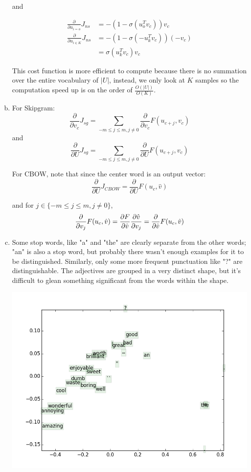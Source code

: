 \documentclass{article}
\newcommand{\dd}[2][]{\frac{\partial #1}{\partial #2}}
\begin{document}
\begin{enumerate}[(a)]
and

\begin{align*} 
\dd{u_{i=o}}J_{ns} &= -(1 - \sigma(u_o^T v_c))v_c \\ 
\dd{u_{i \in K}}J_{ns} &= -(1 - \sigma(-u_k^T v_c))(-v_c) \\
&= \sigma(u_k^T v_c) v_c
\end{align*}

This cost function is more efficient to compute because there is no summation over the entire vocabulary of $|U|$, instead, we only look at $K$ samples so the computation speed up is on the order of $\frac{O(|U|)}{O(K)}$.

\item For Skipgram: $$
\dd{v_c}J_{sg} = \sum_{-m \leq j \leq m,j \neq 0} \dd{v_c}F(u_{c+j}, v_c)
$$ and $$
\dd{U}J_{sg} = \sum_{-m \leq j \leq m,j \neq 0} \dd{U}F(u_{c+j}, v_c)
$$

For CBOW, note that since the center word is an output vector: $$
\dd{U}J_{CBOW} = \dd{U} F(u_c,\hat{v})
$$

and for $j \in \{ -m \leq j \leq m,j \neq 0 \}$, $$
\dd{v_j}F(u_c, \hat{v}) = \dd[F]{\hat{v}} \dd[\hat{v}]{v_j} \\
= \dd{\hat{v}} F(u_c, \hat{v})
$$

\setcounter{enumi}{6}
\item Some stop words, like "a" and "the" are clearly separate from the other words; "an" is also a stop word, but probably there wasn't enough examples for it to be distinguished.  Similarly, only some more frequent punctuation like "?" are distinguishable.  The adjectives are grouped in a very distinct shape, but it's difficult to glean something significant from the words within the shape.

\includegraphics[width=\textwidth]{q3_word_vectors}


\end{enumerate}
\end{document}
